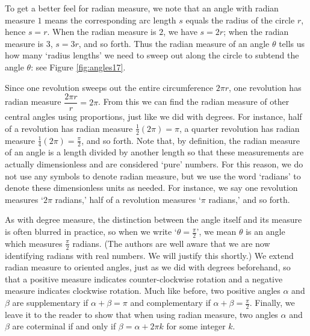 
To get a better feel for radian measure, we note that an angle with radian measure $1$ means the corresponding arc length $s$ equals the radius of the circle $r$, hence $s = r$.  When the radian measure is $2$, we have $s = 2r$; when the radian measure is $3$, $s = 3r$, and so forth.  Thus the radian measure of an angle $\theta$ tells us how many `radius lengths' we need to sweep out along the circle to subtend the angle $\theta$: see Figure \ref{fig:angles17}.


Since one revolution sweeps out the entire circumference $2\pi r$, one revolution has radian measure $\dfrac{2 \pi r}{r} = 2 \pi$.  From this we can find the radian measure of other central angles using proportions, just like we did with degrees.    For instance, half of a revolution has radian measure  $\frac{1}{2} (2 \pi) = \pi$, a quarter revolution has radian measure $\frac{1}{4} (2 \pi) = \frac{\pi}{2}$, and so forth.   Note that, by definition, the radian measure of an angle is a length divided by another length so that these measurements are actually dimensionless and are considered `pure' numbers. For this reason, we do not use any symbols to denote radian measure, but we use the word `radians' to denote these dimensionless units as needed. For instance, we say one revolution measures `$2\pi$ radians,' half of a revolution measures `$\pi$ radians,' and so forth.  

As with degree measure, the distinction between the angle itself and its measure is often blurred in practice, so when we write  `$\theta = \frac{\pi}{2}$', we mean $\theta$ is an angle which measures $\frac{\pi}{2}$ radians. (The authors are well aware that we are now identifying radians with real numbers.  We will justify this shortly.) We extend radian measure to oriented angles, just as we did with degrees beforehand, so that a positive measure indicates counter-clockwise rotation and a negative measure indicates clockwise rotation. Much like before, two positive angles $\alpha$ and $\beta$ are supplementary if $\alpha + \beta = \pi$ and complementary if $\alpha + \beta = \frac{\pi}{2}$.   Finally, we leave it to the reader to show that when using radian measure, two angles $\alpha$ and $\beta$ are coterminal if and only if $\beta = \alpha + 2\pi k$ for some integer $k$. 

